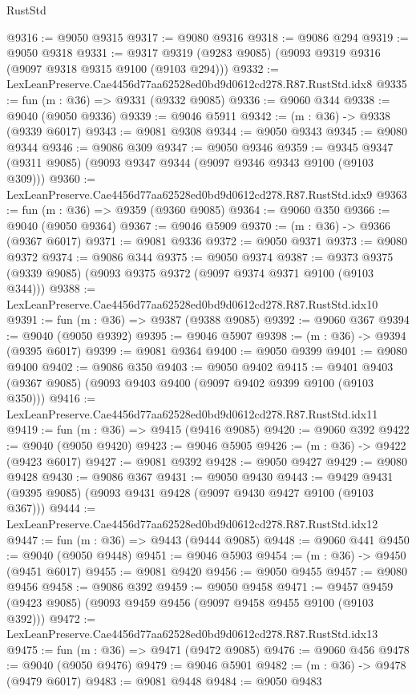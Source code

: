 \begin{lexlean}{RustStd}
\begin{coremodule}
{{@9316 := @9050 @9315
@9317 := @9080 @9316
@9318 := @9086 @294
@9319 := @9050 @9318
@9331 := @9317 @9319 (@9283 @9085) (@9093 @9319 @9316 (@9097 @9318 @9315 @9100 (@9103 @294)))
@9332 := LexLeanPreserve.Cae4456d77aa62528ed0bd9d0612cd278.R87.RustStd.idx8
@9335 := fun (m : @36) => @9331 (@9332 @9085)
@9336 := @9060 @344
@9338 := @9040 (@9050 @9336)
@9339 := @9046 @5911
@9342 := (m : @36) -> @9338 (@9339 @6017)
@9343 := @9081 @9308
@9344 := @9050 @9343
@9345 := @9080 @9344
@9346 := @9086 @309
@9347 := @9050 @9346
@9359 := @9345 @9347 (@9311 @9085) (@9093 @9347 @9344 (@9097 @9346 @9343 @9100 (@9103 @309)))
@9360 := LexLeanPreserve.Cae4456d77aa62528ed0bd9d0612cd278.R87.RustStd.idx9
@9363 := fun (m : @36) => @9359 (@9360 @9085)
@9364 := @9060 @350
@9366 := @9040 (@9050 @9364)
@9367 := @9046 @5909
@9370 := (m : @36) -> @9366 (@9367 @6017)
@9371 := @9081 @9336
@9372 := @9050 @9371
@9373 := @9080 @9372
@9374 := @9086 @344
@9375 := @9050 @9374
@9387 := @9373 @9375 (@9339 @9085) (@9093 @9375 @9372 (@9097 @9374 @9371 @9100 (@9103 @344)))
@9388 := LexLeanPreserve.Cae4456d77aa62528ed0bd9d0612cd278.R87.RustStd.idx10
@9391 := fun (m : @36) => @9387 (@9388 @9085)
@9392 := @9060 @367
@9394 := @9040 (@9050 @9392)
@9395 := @9046 @5907
@9398 := (m : @36) -> @9394 (@9395 @6017)
@9399 := @9081 @9364
@9400 := @9050 @9399
@9401 := @9080 @9400
@9402 := @9086 @350
@9403 := @9050 @9402
@9415 := @9401 @9403 (@9367 @9085) (@9093 @9403 @9400 (@9097 @9402 @9399 @9100 (@9103 @350)))
@9416 := LexLeanPreserve.Cae4456d77aa62528ed0bd9d0612cd278.R87.RustStd.idx11
@9419 := fun (m : @36) => @9415 (@9416 @9085)
@9420 := @9060 @392
@9422 := @9040 (@9050 @9420)
@9423 := @9046 @5905
@9426 := (m : @36) -> @9422 (@9423 @6017)
@9427 := @9081 @9392
@9428 := @9050 @9427
@9429 := @9080 @9428
@9430 := @9086 @367
@9431 := @9050 @9430
@9443 := @9429 @9431 (@9395 @9085) (@9093 @9431 @9428 (@9097 @9430 @9427 @9100 (@9103 @367)))
@9444 := LexLeanPreserve.Cae4456d77aa62528ed0bd9d0612cd278.R87.RustStd.idx12
@9447 := fun (m : @36) => @9443 (@9444 @9085)
@9448 := @9060 @441
@9450 := @9040 (@9050 @9448)
@9451 := @9046 @5903
@9454 := (m : @36) -> @9450 (@9451 @6017)
@9455 := @9081 @9420
@9456 := @9050 @9455
@9457 := @9080 @9456
@9458 := @9086 @392
@9459 := @9050 @9458
@9471 := @9457 @9459 (@9423 @9085) (@9093 @9459 @9456 (@9097 @9458 @9455 @9100 (@9103 @392)))
@9472 := LexLeanPreserve.Cae4456d77aa62528ed0bd9d0612cd278.R87.RustStd.idx13
@9475 := fun (m : @36) => @9471 (@9472 @9085)
@9476 := @9060 @456
@9478 := @9040 (@9050 @9476)
@9479 := @9046 @5901
@9482 := (m : @36) -> @9478 (@9479 @6017)
@9483 := @9081 @9448
@9484 := @9050 @9483
}}
\end{coremodule}
\end{lexlean}
